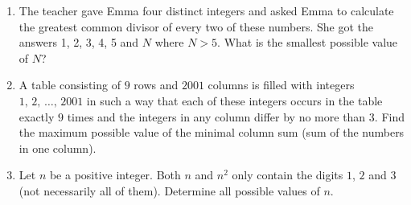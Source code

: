 \documentclass[a4paper,12pt, titlepage]{article}
\begin{document}
\begin{enumerate}[1.]
\item %

The teacher gave Emma four distinct integers and asked Emma to calculate the greatest common divisor of every two of these numbers. She got the answers 1, 2, 3, 4, 5 and $N$ where $N>5$. What is the smallest possible value of $N$?\\

\item %

A table consisting of $9$ rows and $2001$ columns is filled with integers $1,\,2,\,\ldots,\,2001$ in such a way that each of these integers occurs in the table exactly $9$ times and the integers in any column differ by no more than $3$. Find the maximum possible value of the minimal column sum (sum of the numbers in one column).\\













\item %
Let $n$ be a positive integer. Both $n$ and $n^2$ only contain the digits $1$, $2$ and $3$ (not necessarily all of them). Determine all possible values of $n$.\\





\end{enumerate}
\end{document}
